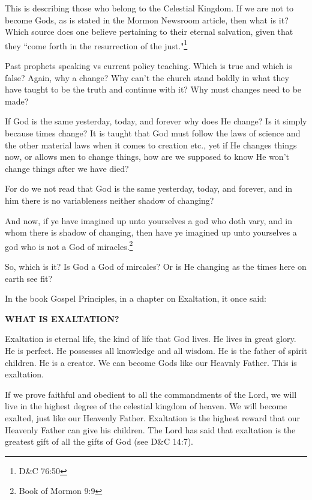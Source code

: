 \documentclass{article}
\begin{document}
This is describing those who belong to the Celestial Kingdom. If we are not to
become Gods, as is stated in the Mormon Newsroom article, then what is it? Which
source does one believe pertaining to their eternal salvation, given that they
``come forth in the resurrection of the just."\footnote{D\&C 76:50} 

Past prophets speaking vs current policy teaching. Which is true and which is
false? Again, why a change? Why can't the church stand boldly in what they have
taught to be the truth and continue with it? Why must changes need to be made?

If God is the same yesterday, today, and forever why does He change? Is it
simply because times change? It is taught that God must follow the laws of
science and the other material laws when it comes to creation etc., yet if He
changes things now, or allows men to change things, how are we supposed to know
He won't change things after we have died?

\begin{displayquote}
For do we not read that God is the same yesterday, today, and forever, and 
in him there is no variableness neither shadow of 
changing?

And now, if ye have imagined up unto yourselves a god who doth vary, and in 
whom there is shadow of changing, then have ye imagined up unto yourselves a 
god who is not a God of miracles.\footnote{Book of Mormon 9:9}
\end{displayquote}

So, which is it? Is God a God of mircales? Or is He changing as the times here
on earth see fit?

In the book Gospel Principles, in a chapter on Exaltation, it once said:

\begin{displayquote}
\textbf{WHAT IS EXALTATION?}

Exaltation is eternal life, the kind of life that God lives. He lives in great
glory. He is perfect. He possesses all knowledge and all wisdom. He is the
father of spirit children. He is a creator. We can become Gods like our Heavnly
Father. This is exaltation.

If we prove faithful and obedient to all the commandments of the Lord, we will
live in the highest degree of the celestial kingdom of heaven. We will become
exalted, just like our Heavenly Father. Exaltation is the highest reward that
our Heavenly Father can give his children. The Lord has said that exaltation
is the greatest gift of all the gifts of 
God (see D\&C 14:7).\cite[pp. 289-290]{gp}
\end{displayquote}
\end{document}
